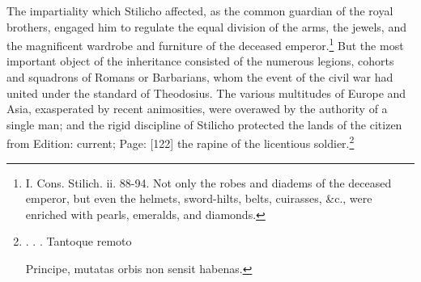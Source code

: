 The impartiality which Stilicho affected, as the common guardian of the royal brothers, engaged him to regulate the equal division of the arms, the jewels, and the magnificent wardrobe and furniture of the deceased emperor.\footnote{I. Cons. Stilich. ii. 88-94. Not only the robes and diadems of the deceased emperor, but even the helmets, sword-hilts, belts, cuirasses, \&c., were enriched with pearls, emeralds, and diamonds.} But the most important object of the inheritance consisted of the numerous legions, cohorts and squadrons of Romans or Barbarians, whom the event of the civil war had united under the standard of Theodosius. The various multitudes of Europe and Asia, exasperated by recent animosities, were overawed by the authority of a single man; and the rigid discipline of Stilicho protected the lands of the citizen from Edition: current; Page: [122] the rapine of the licentious soldier.\footnote{. . . Tantoque remoto

Principe, mutatas orbis non sensit habenas.

}

